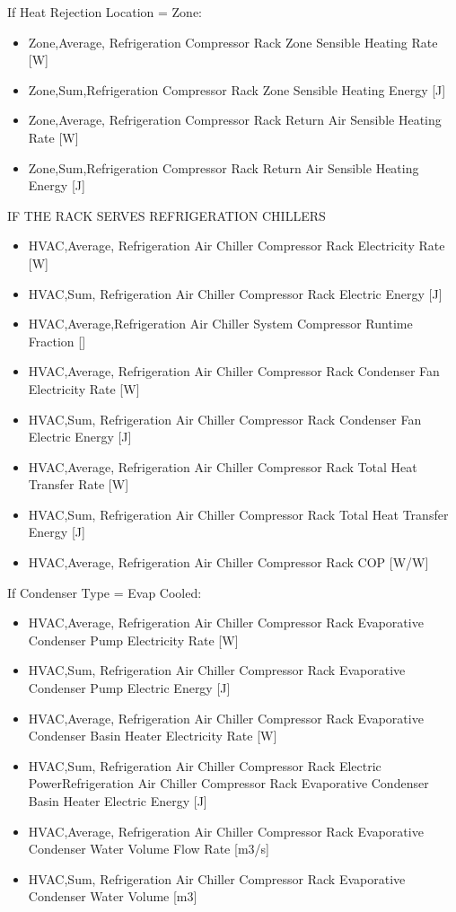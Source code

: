 If Heat Rejection Location = Zone:

\begin{itemize}
\item
  Zone,Average, Refrigeration Compressor Rack Zone Sensible Heating Rate {[}W{]}
\item
  Zone,Sum,Refrigeration Compressor Rack Zone Sensible Heating Energy {[}J{]}
\item
  Zone,Average, Refrigeration Compressor Rack Return Air Sensible Heating Rate {[}W{]}
\item
  Zone,Sum,Refrigeration Compressor Rack Return Air Sensible Heating Energy {[}J{]}
\end{itemize}

IF THE RACK SERVES REFRIGERATION CHILLERS

\begin{itemize}
\item
  HVAC,Average, Refrigeration Air Chiller Compressor Rack Electricity Rate {[}W{]}
\item
  HVAC,Sum, Refrigeration Air Chiller Compressor Rack Electric Energy {[}J{]}
\item
  HVAC,Average,Refrigeration Air Chiller System Compressor Runtime Fraction {[]}
\item
  HVAC,Average, Refrigeration Air Chiller Compressor Rack Condenser Fan Electricity Rate {[}W{]}
\item
  HVAC,Sum, Refrigeration Air Chiller Compressor Rack Condenser Fan Electric Energy {[}J{]}
\item
  HVAC,Average, Refrigeration Air Chiller Compressor Rack Total Heat Transfer Rate {[}W{]}
\item
  HVAC,Sum, Refrigeration Air Chiller Compressor Rack Total Heat Transfer Energy {[}J{]}
\item
  HVAC,Average, Refrigeration Air Chiller Compressor Rack COP {[}W/W{]}
\end{itemize}

If Condenser Type = Evap Cooled:

\begin{itemize}
\item
  HVAC,Average, Refrigeration Air Chiller Compressor Rack Evaporative Condenser Pump Electricity Rate {[}W{]}
\item
  HVAC,Sum, Refrigeration Air Chiller Compressor Rack Evaporative Condenser Pump Electric Energy {[}J{]}
\item
  HVAC,Average, Refrigeration Air Chiller Compressor Rack Evaporative Condenser Basin Heater Electricity Rate {[}W{]}
\item
  HVAC,Sum, Refrigeration Air Chiller Compressor Rack Electric PowerRefrigeration Air Chiller Compressor Rack Evaporative Condenser Basin Heater Electric Energy {[}J{]}
\item
  HVAC,Average, Refrigeration Air Chiller Compressor Rack Evaporative Condenser Water Volume Flow Rate {[}m3/s{]}
\item
  HVAC,Sum, Refrigeration Air Chiller Compressor Rack Evaporative Condenser Water Volume {[}m3{]}
\end{itemize}

